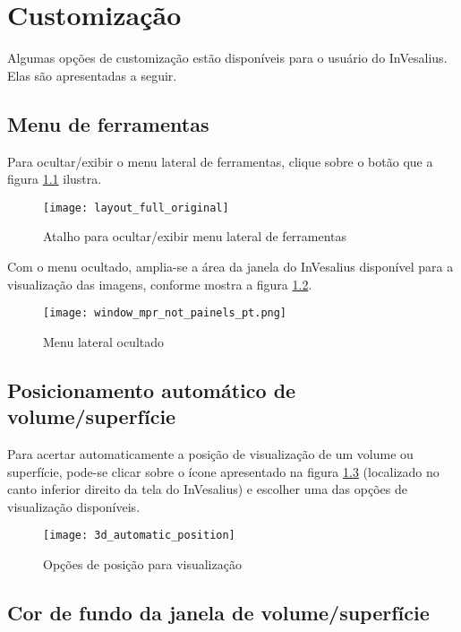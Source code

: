 \chapter{Customização}

Algumas opções de customização estão disponíveis para o usuário do InVesalius. Elas
são apresentadas a seguir.

\section{Menu de ferramentas}

Para ocultar/exibir o menu lateral de ferramentas, clique sobre o botão que a figura
\ref{fig:layout_full_original} ilustra.

\begin{figure}[!htb]
\centering
\texttt{[image: layout\_full\_original]}
\caption{Atalho para ocultar/exibir menu lateral de ferramentas}
\label{fig:layout_full_original}
\end{figure}

Com o menu ocultado, amplia-se a área da janela do InVesalius disponível para a
visualização das imagens, conforme mostra a figura \ref{fig:closed_tool_menu}.

\begin{figure}[!htb]
\centering
\texttt{[image: window\_mpr\_not\_painels\_pt.png]}
\caption{Menu lateral ocultado}
\label{fig:closed_tool_menu}
\end{figure}

\newpage

\section{Posicionamento automático de volume/superfície}

Para acertar automaticamente a posição de visualização de um volume ou superfície,
pode-se clicar sobre o ícone apresentado na figura \ref{fig:3d_automatic_position}
(localizado no canto inferior direito da tela do InVesalius) e escolher uma das
opções de visualização disponíveis.

\begin{figure}[!htb]
\centering
\texttt{[image: 3d\_automatic\_position]}
\caption{Opções de posição para visualização}
\label{fig:3d_automatic_position}
\end{figure}

\section{Cor de fundo da janela de volume/superfície}

